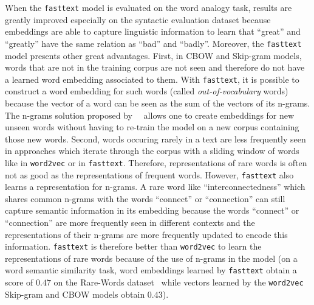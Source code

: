       When the \texttt{fasttext} model is evaluated on the word analogy task,
      results are greatly improved especially on the syntactic evaluation
      dataset because embeddings are able to capture linguistic information to
      learn that ``great'' and ``greatly'' have the same relation as ``bad'' and
      ``badly''. Moreover, the \texttt{fasttext} model presents other great
      advantages. First, in CBOW and Skip-gram models, words that are not in the
      training corpus are not seen and therefore do not have a learned word
      embedding associated to them. With \texttt{fasttext}, it is possible to
      construct a word embedding for such words (called
      \textit{out-of-vocabulary} words) because the vector of a word can be seen
      as the sum of the vectors of its n-grams. The n-grams solution proposed
      by~\citeauthor{bojanowski2016enriching}~\citep{bojanowski2016enriching}
      allows one to create embeddings for new unseen words without having to
      re-train the model on a new corpus containing those new words. Second,
      words occuring rarely in a text are less frequently seen in approaches
      which iterate through the corpus with a sliding window of words like in
      \texttt{word2vec} or in \texttt{fasttext}. Therefore, representations of
      rare words is often not as good as the representations of frequent words.
      However, \texttt{fasttext} also learns a representation for n-grams. A
      rare word like ``interconnectedness'' which shares common n-grams with the
      words ``connect'' or ``connection'' can still capture semantic information
      in its embedding because the words ``connect'' or ``connection'' are more
      frequently seen in different contexts and the representations of their
      n-grams are more frequently updated to encode this information.
      \texttt{fasttext} is therefore better than \texttt{word2vec} to learn the
      representations of rare words because of the use of n-grams in the model
      (on a word semantic similarity task, word embeddings learned by
      \texttt{fasttext} obtain a score of $0.47$ on the Rare-Words
      dataset~\citep{luong2013better} while vectors learned by the
      \texttt{word2vec} Skip-gram and CBOW models obtain $0.43$).

